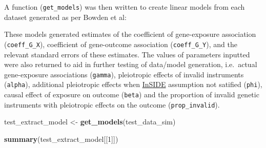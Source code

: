 \documentclass[
]{article}
\newenvironment{Shaded}{\begin{snugshade}}{\end{snugshade}}
\newcommand{\DecValTok}[1]{\textcolor[rgb]{0.00,0.00,0.81}{#1}}
\newcommand{\FunctionTok}[1]{\textcolor[rgb]{0.13,0.29,0.53}{\textbf{#1}}}
\newcommand{\NormalTok}[1]{#1}
\newcommand{\OtherTok}[1]{\textcolor[rgb]{0.56,0.35,0.01}{#1}}
\begin{document}
A function (\texttt{get\_models}) was then written to create linear models from each dataset generated as per Bowden et al:

These models generated estimates of the coefficient of gene-exposure association (\texttt{coeff\_G\_X}), coefficient of gene-outcome association (\texttt{coeff\_G\_Y}), and the relevant standard errors of these estimates. The values of parameters inputted were also returned to aid in further testing of data/model generation, i.e.~actual gene-exposure associations (\texttt{gamma}), pleiotropic effects of invalid instruments (\texttt{alpha}), additional pleiotropic effects when \hyperref[acronyms_InSIDE]{InSIDE} assumption not satified (\texttt{phi}), causal effect of exposure on outcome (\texttt{beta}) and the proportion of invalid genetic instruments with pleiotropic effects on the outcome (\texttt{prop\_invalid}).

\begin{Shaded}
\begin{Highlighting}[]
\NormalTok{test\_extract\_model }\OtherTok{\textless{}{-}} \FunctionTok{get\_models}\NormalTok{(test\_data\_sim)}

\FunctionTok{summary}\NormalTok{(test\_extract\_model[[}\DecValTok{1}\NormalTok{]])}
\end{Highlighting}
\end{Shaded}
\end{document}
